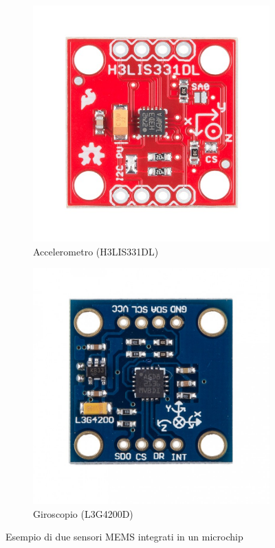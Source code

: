 \begin{figure}[!htb]
    \centering
    \begin{subfigure}{0.4\textwidth}
        \includegraphics[width=\textwidth]{figures/accelerometer.jpg}
        \caption{Accelerometro (H3LIS331DL)}
        \label{fig:accelerometer}
    \end{subfigure}
    \begin{subfigure}{0.4\textwidth}
        \includegraphics[width=\textwidth]{figures/gyroscope.jpg}
        \caption{Giroscopio (L3G4200D)}
        \label{fig:gyroscope}
    \end{subfigure}
    \caption{Esempio di due sensori MEMS integrati in un microchip}
    \label{fig:accelerometer_gyroscope}
\end{figure}

